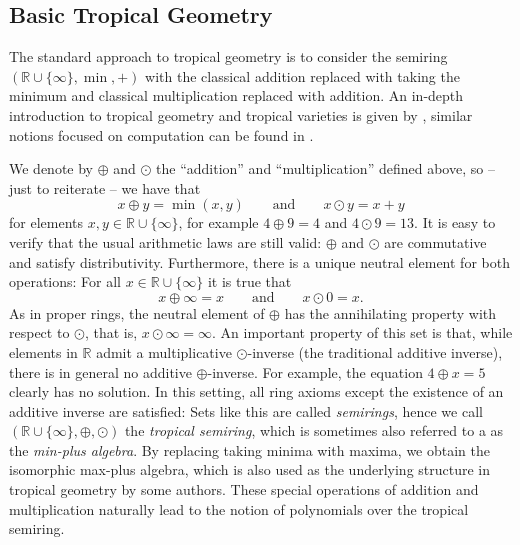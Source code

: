\documentclass[
  paper=a4,
  titlepage,
  bibliography=totoc,
  pagesize=pdftex
]{scrartcl}
\numberwithin{figure}{section}
\numberwithin{equation}{section}
\numberwithin{table}{section}
\newcommand*\setR{\mathds{R}}
\theoremstyle{definition}
\numberwithin{definition}{section}
\begin{document}
\subsection{Basic Tropical Geometry}
\label{sec:tropIntro}

The standard approach to tropical geometry is to consider the semiring $(\setR \cup
\{\infty\}, \min, +)$ with the classical addition replaced with taking the minimum and
classical multiplication replaced with addition. An in-depth introduction to tropical
geometry and tropical varieties is given by \cite{sturmMacTrop}, similar notions focused
on computation can be found in \cite{compTropVar}.

We denote by $\oplus$ and $\odot$ the \enquote{addition} and \enquote{multiplication}
defined above, so -- just to reiterate -- we have that
\[
  x \oplus y = \min(x,y)
  \qquad \text{and} \qquad
  x \odot y = x+y
\]
for elements $x,y\in \setR\cup\{\infty\}$, for example $4\oplus9 = 4$ and $4\odot9 = 13$.
It is easy to verify that the usual arithmetic laws are still valid: $\oplus$ and $\odot$
are commutative and satisfy distributivity. Furthermore, there is a unique neutral
element for both operations: For all $x\in \setR\cup \{\infty\}$ it is true that
\[
  x \oplus \infty = x
  \qquad \text{and} \qquad
  x \odot 0 = x.
\]
As in proper rings, the neutral element of $\oplus$ has the annihilating property with
respect to $\odot$, that is, $x\odot \infty = \infty$. An important property of this set
is that, while elements in $\setR$ admit a multiplicative $\odot$-inverse (the traditional
additive inverse), there is in general no additive $\oplus$-inverse. For example, the
equation $4\oplus x = 5$ clearly has no solution. In this setting, all ring axioms except
the existence of an additive inverse are satisfied: Sets like this are called
\emph{semirings}, hence we call $(\setR\cup \{\infty\}, \oplus, \odot)$ the \emph{tropical
semiring}, which is sometimes also referred to a as the \emph{min-plus algebra}. By
replacing taking minima with maxima, we obtain the isomorphic max-plus algebra, which is
also used as the underlying structure in tropical geometry by some authors. These special
operations of addition and multiplication naturally lead to the notion of polynomials over
the tropical semiring.
\end{document}
